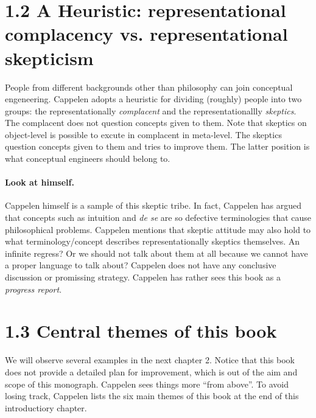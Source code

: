 \documentclass[
10pt, %
a4paper, %
twocolumn, %
landscape %
]{article}
\begin{document}
\section*{1.2 A Heuristic: representational complacency vs. representational skepticism}

People from different backgrounds other than philosophy can join conceptual engeneering. Cappelen adopts a heuristic for dividing (roughly) people into two groups: the representationally \emph{complacent} and the representationallly \emph{skeptics}.
The complacent does not question concepts given to them.
Note that skeptics on object-level is possible to excute in complacent in meta-level.
The skeptics question concepts given to them and tries to improve them. The latter position is what conceptual engineers should belong to.

\paragraph{Look at himself.}
Cappelen himself is a sample of this skeptic tribe.
In fact, Cappelen has argued that concepts such as intuition and \textit{de se} are so defective terminologies that cause philosophical problems.
Cappelen mentions that skeptic attitude may also hold to what terminology/concept describes representationally skeptics themselves. An infinite regress? Or we should not talk about them at all because we cannot have a proper language to talk about? Cappelen does not have any conclusive discussion or promissing strategy. Cappelen has rather sees this book as a \emph{progress report}. 

\section*{1.3 Central themes of this book}
We will observe several examples in the next chapter 2. Notice that this book does not provide a detailed plan for improvement, which is out of the aim and scope of this monograph. Cappelen sees things more ``from above''.
To avoid losing track, Cappelen lists the six main themes of this book at the end of this introductiory chapter.
\end{document}
